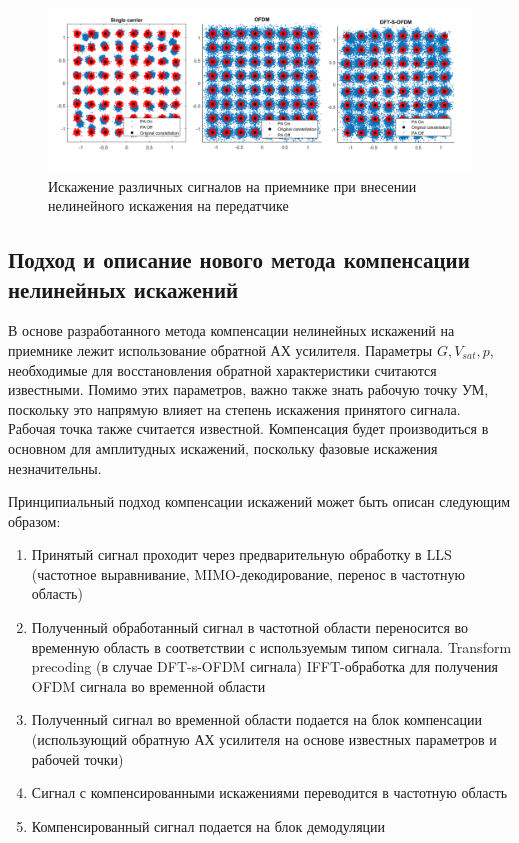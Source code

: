 \begin{figure}[h!]
    \centering
    \includegraphics[width=0.95\linewidth]{figs/ofdm_pa_distortions.png}
    \caption{Искажение различных сигналов на приемнике при внесении нелинейного
    искажения на передатчике}
    \label{fig:lls_rapp_distortions}
\end{figure}

\subsection{Подход и описание нового метода компенсации нелинейных искажений}
В основе разработанного метода компенсации нелинейных искажений на
приемнике лежит использование обратной АХ усилителя. Параметры $G, V_{sat},
p$, необходимые для восстановления обратной характеристики считаются
известными. Помимо этих параметров, важно также знать рабочую точку УМ,
поскольку это напрямую влияет на степень искажения принятого сигнала.
Рабочая точка также считается известной. Компенсация будет производиться
в основном для амплитудных искажений, поскольку фазовые искажения незначительны.

Принципиальный подход компенсации искажений может быть описан следующим
образом:
\begin{enumerate}
    \item Принятый сигнал проходит через предварительную обработку в LLS
    (частотное выравнивание, MIMO-декодирование, перенос в частотную
    область)
    \item Полученный обработанный сигнал в частотной области переносится во
    временную область в соответствии с используемым типом сигнала.
    \subitem Transform precoding (в случае DFT-s-OFDM сигнала)
    \subitem IFFT-обработка для получения OFDM сигнала во временной области
    \item Полученный сигнал во временной области подается на блок
    компенсации (использующий обратную АХ усилителя на основе известных
    параметров и рабочей точки)
    \item Сигнал с компенсированными искажениями переводится в частотную
    область
    \item Компенсированный сигнал подается на блок демодуляции
\end{enumerate}


